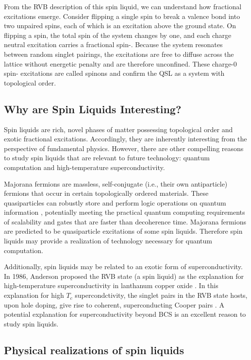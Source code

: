 From the RVB description of this spin liquid, we can understand how fractional excitations emerge. Consider flipping a single spin to break a valence bond into two unpaired spins, each of which is an excitation above the ground state. On flipping a spin, the total spin of the system changes by one, and each charge neutral excitation carries a fractional spin-\textonehalf{}. Because the system resonates between random singlet pairings, the excitations are free to diffuse across the lattice without energetic penalty and are therefore unconfined. These charge-0 spin-\textonehalf{} excitations are called spinons and confirm the QSL as a system with topological order.

\subsection{Why are Spin Liquids Interesting?}

Spin liquids are rich, novel phases of matter possessing topological order and exotic fractional excitations. Accordingly, they are inherently interesting from the perspective of fundamental physics. However, there are other compelling reasons to study spin liquids that are relevant to future technology: quantum computation and high-temperature superconductivity. 

Majorana fermions are massless, self-conjugate (i.e., their own antiparticle) fermions that occur in certain topologically ordered materials. These quasiparticles can robustly store and perform logic operations on quantum information \cite{Lian2017}, potentially meeting the practical quantum computing requirements of scalability and gates that are faster than decoherence time. Majorana fermions are predicted to be quasiparticle excitations of some spin liquids. Therefore spin liquids may provide a realization of technology necessary for quantum computation.

Additionally, spin liquids may be related to an exotic form of superconductivity. In 1986, Anderson proposed the RVB state (a spin liquid) as the explanation for high-temperature superconductivity in lanthanum copper oxide \cite{Anderson1986}. In this explanation for high $T_{c}$ supercondctivity, the singlet pairs in the RVB state hosts, upon hole doping, give rise to coherent, superconducting Cooper pairs  \cite{Chen2018}. A potential explanation for superconductivity beyond BCS is an excellent reason to study spin liquids.

\subsection{Physical realizations of spin liquids}

